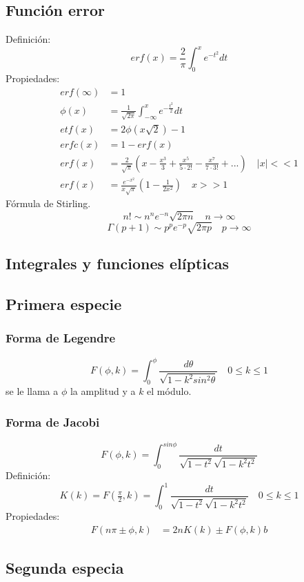 \documentclass{article}
\begin{document}
\subsection*{Función error}
Definición:
\[ erf(x) = \frac{2}{\pi} \int_{0}^x e^{-t^2}dt \]
Propiedades:
\begin{align*}
    erf(\infty) &= 1 \\
    \phi(x) &= \frac{1}{\sqrt{2\pi}} \int_{-\infty}^x e^{-\frac{t^2}{2}}dt \\
    etf(x) &= 2\phi(x\sqrt{2})-1 \\ 
    erfc(x) &= 1- erf(x) \\ 
    erf(x) &= \frac{2}{\sqrt{\pi}} (x-\frac{x^3}{3}+\frac{x^5}{5 \cdot 2!}-\frac{x^7}{7 \cdot 3!}+...) \quad |x|<< 1 \\
    erf(x) &= \frac{e^{-x^2}}{x\sqrt{\pi}} \left( 1-\frac{1}{2x^2} \right) \quad x>>1
  \end{align*}
Fórmula de Stirling.
\[ n! \sim n^n e^{-n} \sqrt{2\pi n} \quad n \to \infty \]
\[ \Gamma(p+1) \sim p^pe^{-p}\sqrt{2\pi p} \quad p \to \infty \]

\subsection*{Integrales y funciones elípticas}
\subsection*{Primera especie}
\subsubsection*{Forma de Legendre} 
\[ F(\phi,k) = \int_0^\phi \frac{d\theta}{\sqrt{1-k^2sin^2\theta}} \quad 0 \leq k \leq 1\]
se le llama a $\phi$ la amplitud y a $k$ el módulo.
\subsubsection*{Forma de Jacobi}
\[ F(\phi,k) =  \int_0^{sin\phi} \frac{dt}{\sqrt{1-t^2}\sqrt{1-k^2t^2}} \]
Definición:
\[ K(k) = F(\tfrac{\pi}{2},k) = \int_0^1 \frac{dt}{\sqrt{1-t^2}\sqrt{1-k^2t^2}} \quad 0 \leq k \leq 1\]
Propiedades:
\begin{align*}
    F(n\pi \pm \phi, k) &= 2nK(k) \pm F(\phi,k)b
\end{align*}

\subsection*{Segunda especia}
\end{document}
